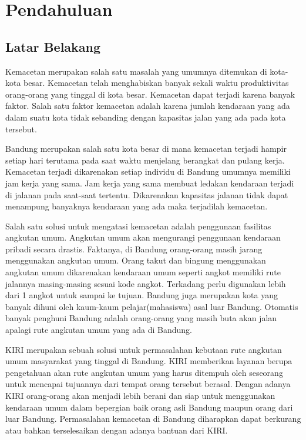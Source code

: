 \chapter{Pendahuluan}
\label{chap: pendahuluan}

\section{Latar Belakang}
\label{sec:latarBelakang}
Kemacetan merupakan salah satu masalah yang umumnya ditemukan di kota-kota besar. Kemacetan telah menghabiskan banyak sekali waktu produktivitas orang-orang yang tinggal di kota besar. Kemacetan dapat terjadi karena banyak faktor. Salah satu faktor kemacetan adalah karena jumlah kendaraan yang ada dalam suatu kota tidak sebanding dengan kapasitas jalan yang ada pada kota tersebut.

Bandung merupakan salah satu kota besar di mana kemacetan terjadi hampir setiap hari terutama pada saat waktu menjelang berangkat dan pulang kerja. Kemacetan terjadi dikarenakan setiap individu di Bandung umumnya memiliki jam kerja yang sama. Jam kerja yang sama membuat ledakan kendaraan terjadi di jalanan pada saat-saat tertentu. Dikarenakan kapasitas jalanan tidak dapat menampung banyaknya kendaraan yang ada maka terjadilah kemacetan.

Salah satu solusi untuk mengatasi kemacetan adalah penggunaan fasilitas angkutan umum. Angkutan umum akan mengurangi penggunaan kendaraan pribadi secara drastis. Faktanya, di Bandung orang-orang masih jarang menggunakan angkutan umum. Orang takut dan bingung menggunakan angkutan umum dikarenakan kendaraan umum seperti angkot memiliki rute jalannya masing-masing sesuai kode angkot. Terkadang perlu digunakan lebih dari 1 angkot untuk sampai ke tujuan. Bandung juga merupakan kota yang banyak dihuni oleh kaum-kaum pelajar(mahasiswa) asal luar Bandung. Otomatis banyak penghuni Bandung adalah orang-orang yang masih buta akan jalan apalagi rute angkutan umum yang ada di Bandung.

KIRI merupakan sebuah solusi untuk permasalahan kebutaan rute angkutan umum masyarakat yang tinggal di Bandung. KIRI memberikan layanan berupa pengetahuan akan rute angkutan umum yang harus ditempuh oleh seseorang untuk mencapai tujuannya dari tempat orang tersebut berasal. Dengan adanya KIRI orang-orang akan menjadi lebih berani dan siap untuk menggunakan kendaraan umum dalam bepergian baik orang asli Bandung maupun orang dari luar Bandung. Permasalahan kemacetan di Bandung diharapkan dapat berkurang atau bahkan terselesaikan dengan adanya bantuan dari KIRI.

